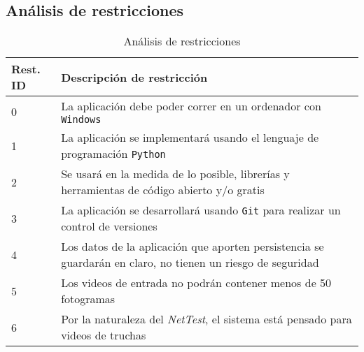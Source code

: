\subsection{Análisis de restricciones}

\begin{table}[H]
    \begin{center}
        \begin{tabular}{p{} | p{}}
            Rest. ID & Descripción de restricción\\
            \hline
            0& La aplicación debe poder correr en un ordenador con \texttt{Windows}\\
            \hline
            1& La aplicación se implementará usando el lenguaje de programación \texttt{Python}\\
            \hline
            2& Se usará en la medida de lo posible, librerías y herramientas de código abierto y/o gratis\\
            \hline
            3& La aplicación se desarrollará usando \texttt{Git} para realizar un control de versiones\\
            \hline
            4& Los datos de la aplicación que aporten persistencia se guardarán en claro, no tienen un riesgo de seguridad\\%
            \hline
            5& Los videos de entrada no podrán contener menos de 50 fotogramas\\
            \hline
            6& Por la naturaleza del \textit{NetTest}, el sistema está pensado para videos de truchas\\
            \hline
        \end{tabular} 
    \end{center}
    \caption{Análisis de restricciones}
    \label{Restricciones}
\end{table}
